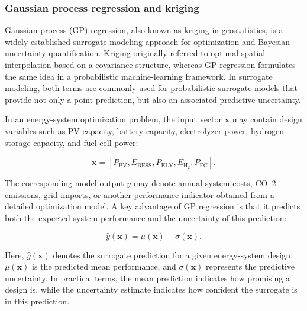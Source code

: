 \subsubsection{Gaussian process regression and kriging}
\label{sec:tax:gp}

Gaussian process (GP) regression, also known as kriging in
geostatistics, is a widely established surrogate modeling approach for
optimization and Bayesian uncertainty quantification. Kriging originally
referred to optimal spatial interpolation based on a covariance
structure, whereas GP regression formulates the same idea in a
probabilistic machine-learning framework. In surrogate modeling, both
terms are commonly used for probabilistic surrogate models that provide
not only a point prediction, but also an associated predictive
uncertainty.

In an energy-system optimization problem, the input vector $\mathbf{x}$
may contain design variables such as PV capacity, battery capacity,
electrolyzer power, hydrogen storage capacity, and fuel-cell power:

$$\begin{equation}
 \mathbf{x} = \left[ P_{\mathrm{PV}}, E_{\mathrm{BESS}}, P_{\mathrm{ELY}}, E_{\mathrm{H_2}}, P_{\mathrm{FC}} \right].
\end{equation}$$

The corresponding model output $y$ may denote annual system costs, CO~2~
emissions, grid imports, or another performance indicator obtained from
a detailed optimization model. A key advantage of GP regression is that
it predicts both the expected system performance and the uncertainty of
this prediction:

$$\begin{equation}
 \hat{y}(\mathbf{x}) = \mu(\mathbf{x}) \pm \sigma(\mathbf{x}).
\end{equation}$$

Here, $\hat{y}(\mathbf{x})$ denotes the surrogate prediction for a given
energy-system design, $\mu(\mathbf{x})$ is the predicted mean
performance, and $\sigma(\mathbf{x})$ represents the predictive
uncertainty. In practical terms, the mean prediction indicates how
promising a design is, while the uncertainty estimate indicates how
confident the surrogate is in this prediction.

